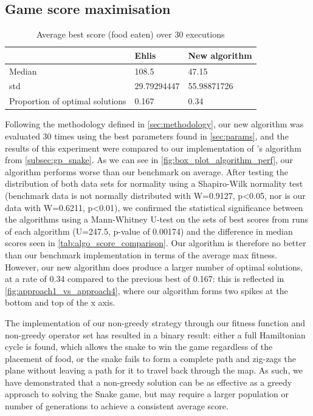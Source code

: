 \documentclass[british,10pt,a4paper]{article}
\begin{document}
\subsection{Game score maximisation}
\begin{table}[b]
	\centering
	\begin{tabular}{|l|l|l|}
	\hline
	 & Ehlis & New algorithm \\ \hline
	Median & 108.5 & 47.15 \\ \hline
	std & 29.79294447 & 55.98871726 \\ \hline
	Proportion of optimal solutions & 0.167 & 0.34 \\ \hline
	\end{tabular}
	\caption{Average best score (food eaten) over 30 executions}
	\label{tab:algo_score_comparison}
\end{table}
Following the methodology defined in \autoref{sec:methodology}, our new algorithm was evaluated 30 times using the best parameters found in \autoref{sec:params}, and the results of this experiment were compared to our implementation of \citet{Ehlis2000-sz}'s algorithm from \autoref{subsec:gp_snake}. As we can see in \autoref{fig:box_plot_algorithm_perf}, our algorithm performs worse than our benchmark on average. After testing the distribution of both data sets for normality using a Shapiro-Wilk normality test \cite{Shapiro1965-my} (benchmark data is not normally distributed with W=0.9127, p<0.05, nor is our data with W=0.6211, p<0.01), we confirmed the statistical significance between the algorithms using a Mann-Whitney U-test on the sets of best scores from runs of each algorithm (U=247.5, p-value of 0.00174) and the difference in median scores seen in \autoref{tab:algo_score_comparison}. Our algorithm is therefore no better than our benchmark implementation in terms of the average max fitness. However, our new algorithm does produce a larger number of optimal solutions, at a rate of 0.34 compared to the previous best of 0.167: this is reflected in \autoref{fig:approach1_vs_approach4}, where our algorithm forms two spikes at the bottom and top of the x axis. 

The implementation of our non-greedy strategy through our fitness function and non-greedy operator set has resulted in a binary result: either a full Hamiltonian cycle is found, which allows the snake to win the game regardless of the placement of food, or the snake fails to form a complete path and zig-zags the plane without leaving a path for it to travel back through the map. As such, we have demonstrated that a non-greedy solution can be as effective as a greedy approach to solving the Snake game, but may require a larger population or number of generations to achieve a consistent average score.
\end{document}
